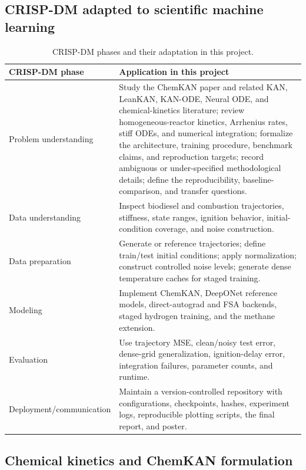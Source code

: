 \documentclass[11pt,a4paper]{article}
\begin{document}
\subsection{CRISP-DM adapted to scientific machine learning}

\begin{table}[H]
\centering
\small
\caption{CRISP-DM phases and their adaptation in this project.}
\label{tab:crispdm}
\begin{tabularx}{\textwidth}{@{}p{}X@{}}
\toprule
\textbf{CRISP-DM phase} & \textbf{Application in this project} \\
\midrule
Problem understanding & Study the ChemKAN paper and related KAN, LeanKAN, KAN-ODE, Neural ODE, and chemical-kinetics literature; review homogeneous-reactor kinetics, Arrhenius rates, stiff ODEs, and numerical integration; formalize the architecture, training procedure, benchmark claims, and reproduction targets; record ambiguous or under-specified methodological details; define the reproducibility, baseline-comparison, and transfer questions. \\
Data understanding & Inspect biodiesel and combustion trajectories, stiffness, state ranges, ignition behavior, initial-condition coverage, and noise construction. \\
Data preparation & Generate or reference trajectories; define train/test initial conditions; apply normalization; construct controlled noise levels; generate dense temperature caches for staged training. \\
Modeling & Implement ChemKAN, DeepONet reference models, direct-autograd and FSA backends, staged hydrogen training, and the methane extension. \\
Evaluation & Use trajectory MSE, clean/noisy test error, dense-grid generalization, ignition-delay error, integration failures, parameter counts, and runtime. \\
Deployment/communication & Maintain a version-controlled repository with configurations, checkpoints, hashes, experiment logs, reproducible plotting scripts, the final report, and poster. \\
\bottomrule
\end{tabularx}
\end{table}

\subsection{Chemical kinetics and ChemKAN formulation}
\end{document}
